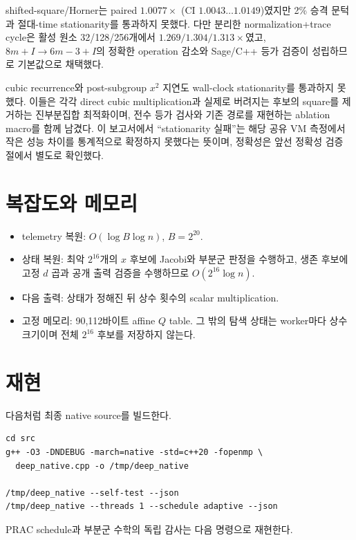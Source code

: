 \documentclass[10pt,a4paper]{article}
\begin{document}
shifted-square/Horner는 paired \(1.0077\times\)
(CI \(1.0043\ldots1.0149\))였지만 2\% 승격 문턱과 절대-time
stationarity를 통과하지 못했다. 다만 분리한 normalization+trace cycle은
활성 원소 32/128/256개에서
\(1.269/1.304/1.313\times\)였고,
\(8m+I\to6m-3+I\)의 정확한 operation 감소와 Sage/C++ 등가 검증이
성립하므로 기본값으로 채택했다.

cubic recurrence와 post-subgroup \(x^2\) 지연도 wall-clock
stationarity를 통과하지 못했다. 이들은 각각 direct cubic multiplication과
실제로 버려지는 후보의 square를 제거하는 진부분집합 최적화이며,
전수 등가 검사와 기존 경로를 재현하는 ablation macro를 함께 남겼다.
이 보고서에서 ``stationarity 실패''는 해당 공유 VM 측정에서 작은 성능
차이를 통계적으로 확정하지 못했다는 뜻이며, 정확성은 앞선 정확성 검증
절에서 별도로 확인했다.

\section{복잡도와 메모리}

\begin{itemize}
  \item telemetry 복원:
        \(O(\log B\log n)\), \(B=2^{20}\).
  \item 상태 복원:
        최악 \(2^{16}\)개의 \(x\) 후보에 Jacobi와 부분군 판정을 수행하고,
        생존 후보에 고정 \(d\) 곱과 공개 출력 검증을 수행하므로
        \(O(2^{16}\log n)\).
  \item 다음 출력:
        상태가 정해진 뒤 상수 횟수의 scalar multiplication.
  \item 고정 메모리:
        90,112바이트 affine \(Q\) table.
        그 밖의 탐색 상태는 worker마다 상수 크기이며 전체 \(2^{16}\)
        후보를 저장하지 않는다.
\end{itemize}

\section{재현}

다음처럼 최종 native source를 빌드한다.

\begin{lstlisting}
cd src
g++ -O3 -DNDEBUG -march=native -std=c++20 -fopenmp \
  deep_native.cpp -o /tmp/deep_native

/tmp/deep_native --self-test --json
/tmp/deep_native --threads 1 --schedule adaptive --json
\end{lstlisting}

PRAC schedule과 부분군 수학의 독립 감사는 다음 명령으로 재현한다.
\end{document}
